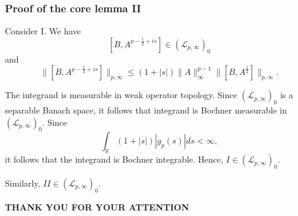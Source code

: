 \documentclass{beamer}
\theoremstyle{definition}
\begin{document}
\begin{frame}
\frametitle{Proof of the core lemma II}
Consider I. We have
$$[B,A^{p-\frac12+is}]\in (\mathcal{L}_{p,\infty})_0$$
and
$$\|[B,A^{p-\frac12+is}]\|_{p,\infty}\leq(1+|s|)\|A\|_{\infty}^{p-1}\|[B,A^{\frac12}]\|_{p,\infty}.$$

The integrand is measurable in weak operator topology. Since $(\mathcal{L}_{p,\infty})_0$ is a separable Banach space, it follows that integrand is Bochner measurable in $(\mathcal{L}_{p,\infty})_0.$ Since
$$\int_{\mathbb{R}}(1+|s|)|g_p(s)|ds<\infty,$$
it follows that the integrand is Bochner integrable. Hence, $I\in (\mathcal{L}_{p,\infty})_0.$

Similarly, $II\in (\mathcal{L}_{p,\infty})_0.$
\end{frame}





\begin{frame}

{\bf\Huge THANK YOU FOR YOUR ATTENTION}
\end{frame}
\end{document}
